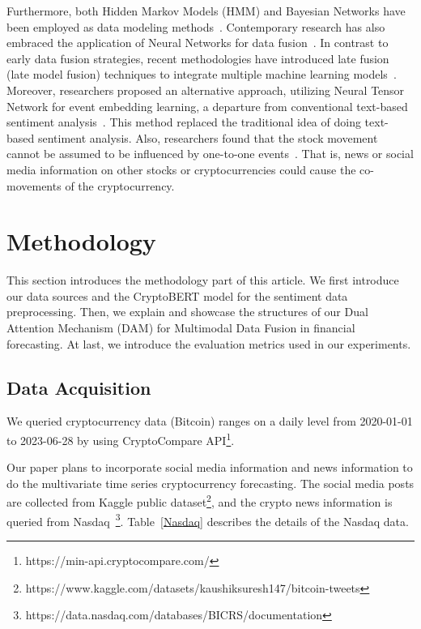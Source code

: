 Furthermore, both Hidden Markov Models (HMM) and Bayesian Networks have been employed as data modeling methods~\cite{hashish2019hybrid}. Contemporary research has also embraced the application of Neural Networks for data fusion~\cite{costa2023show,zhang2022forecasting}. In contrast to early data fusion strategies, recent methodologies have introduced late fusion (late model fusion) techniques to integrate multiple machine learning models~\cite{bhatt2023machine,critien2022bitcoin}. Moreover, researchers proposed an alternative approach, utilizing Neural Tensor Network for event embedding learning, a departure from conventional text-based sentiment analysis~\cite{ding2015deep}. This method replaced the traditional idea of doing text-based sentiment analysis. Also, researchers found that the stock movement cannot be assumed to be influenced by one-to-one events~\cite{li2020multimodal}. That is, news or social media information on other stocks or cryptocurrencies could cause the co-movements of the cryptocurrency.

\section{Methodology}
\label{Methodology}
This section introduces the methodology part of this article. We first introduce our data sources and the CryptoBERT model for the sentiment data preprocessing. Then, we explain and showcase the structures of our Dual Attention Mechanism (DAM) for Multimodal Data Fusion in financial forecasting. At last, we introduce the evaluation metrics used in our experiments.
\subsection{Data Acquisition}
We queried cryptocurrency data (Bitcoin) ranges on a daily level from 2020-01-01 to 2023-06-28 by using CryptoCompare API\footnote{https://min-api.cryptocompare.com/}.

Our paper plans to incorporate social media information and news information to do the multivariate time series cryptocurrency forecasting. The social media posts are collected from Kaggle public dataset\footnote{https://www.kaggle.com/datasets/kaushiksuresh147/bitcoin-tweets}, and the crypto news information is queried from Nasdaq~\footnote{https://data.nasdaq.com/databases/BICRS/documentation}. Table~\ref{Nasdaq} describes the details of the Nasdaq data.
\begin{table}
\centering
\caption{Data Descriptor of Nasdaq Data}
\label{Nasdaq}
\end{table}
